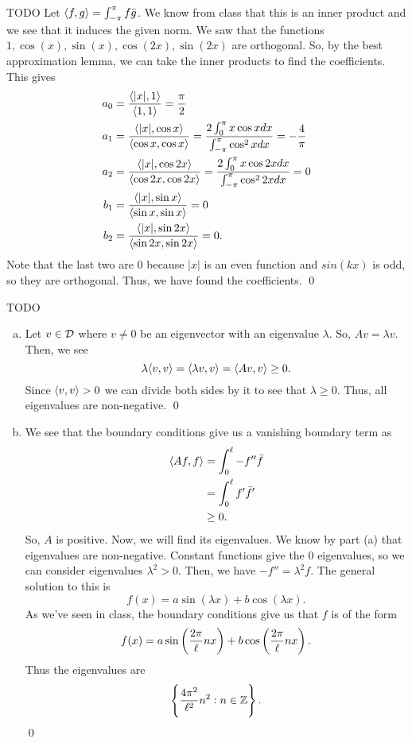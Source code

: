 \documentclass{article}
\begin{document}
\newpage
{} TODO
 \tri
\hop 
\solution
Let $\ang{f,g} = \int_{-\pi}^\pi f\bar{g}$. We know from class that this is an inner product and we see that it induces the given norm. We saw that the functions $1, \cos(x), \sin(x), \cos(2x), \sin(2x)$ are orthogonal. So, by the best approximation lemma, we can take the inner products to find the coefficients. This gives 
\begin{align*}
    a_0 &= \frac{\ang{|x|, 1}}{\ang{1,1}} = \frac{\pi}{2}\\
    a_1 &= \frac{\ang{|x|, \cos x}}{\ang{\cos x, \cos x} }= \frac{2\int_0^\pi x \cos x dx}{\int_{-\pi}^\pi\cos^2 x dx} = -\frac{4}{\pi} \\
    a_2 &= \frac{\ang{|x|, \cos 2x}}{\ang{\cos 2x, \cos 2x}} = \frac{2\int_0^\pi x \cos 2x dx}{\int_{-\pi}^\pi\cos^2 2x dx} = 0\\
    b_1 &= \frac{\ang{|x|, \sin x}}{\ang{\sin x, \sin x}} = 0 \\
    b_2&= \frac{\ang{|x|, \sin 2x}}{\ang{\sin 2x, \sin 2x}} = 0.
\end{align*}
Note that the last two are 0 because $|x|$ is an even function and $sin(kx)$ is odd, so they are orthogonal. Thus, we have found the coefficients. \qed


\newpage
{} TODO
 \tri
\hop 
\solution
\begin{enumerate}[(a)]
    \item Let $v \in \cal{D}$ where $v \ne 0$ be an eigenvector with an eigenvalue $\lambda$. So, $Av = \lambda v$. Then, we see 
    \[\lambda \ang{v,v} = \ang{\lambda v, v} = \ang{Av, v} \ge 0.\]
    Since $\ang{v,v} >0$ we can divide both sides by it to see that $\lambda \ge 0$. Thus, all eigenvalues are non-negative. \qed
    \item We see that the boundary conditions give us a vanishing boundary term as 
    \begin{align*}
        \ang{Af, f} &= \int_0^\ell -f''\bar{f} \\
        &=  \int_0^\ell f'\bar{f}'\\
        &\ge 0.
    \end{align*}
    So, $A$ is positive. 
    \hop
    Now, we will find its eigenvalues. We know by part (a) that eigenvalues are non-negative. Constant functions give the 0 eigenvalues, so we can consider eigenvalues $\lambda^2 >0$. Then, we have $-f'' = \lambda^2 f$. The general solution to this is 
    \[f(x) = a\sin(\lambda x) + b \cos(\lambda x).\]
    As we've seen in class, the boundary conditions give us that $f$ is of the form
    \[f(x) = a\sin\del{\frac{2\pi}{\ell}nx}+b\cos\del{\frac{2\pi}{\ell}nx}.\]
    Thus the eigenvalues are 
    \[\cbr{\frac{4\pi^2}{\ell^2}n^2: n \in \ZZ}.\]
    \qed
\end{enumerate}
\end{document}
